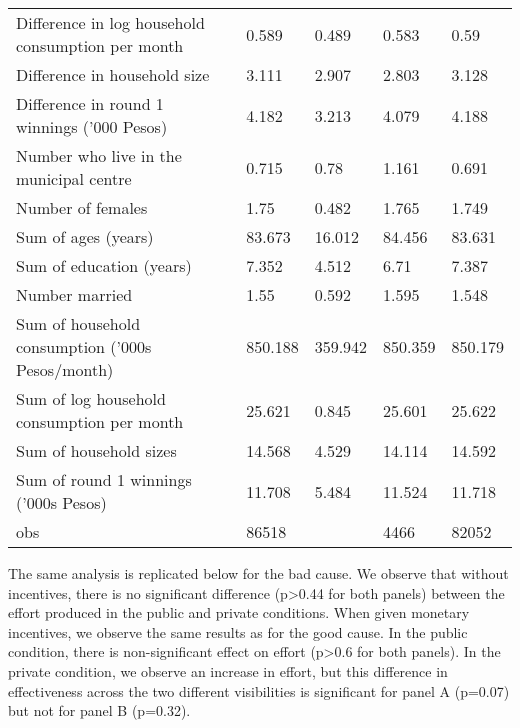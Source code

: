 \documentclass[]{elsarticle} %
\begin{document}
\begin{table}[!h]
\begin{tabular}{lllll}
Difference in log household consumption per month & 0.589 & 0.489 & 0.583 & 0.59\\
Difference in household size & 3.111 & 2.907 & 2.803 & 3.128\\
Difference in round 1 winnings ('000 Pesos) & 4.182 & 3.213 & 4.079 & 4.188\\
\addlinespace
Number who live in the municipal centre & 0.715 & 0.78 & 1.161 & 0.691\\
Number of females & 1.75 & 0.482 & 1.765 & 1.749\\
Sum of ages (years) & 83.673 & 16.012 & 84.456 & 83.631\\
Sum of education (years) & 7.352 & 4.512 & 6.71 & 7.387\\
Number married & 1.55 & 0.592 & 1.595 & 1.548\\
\addlinespace
Sum of household consumption ('000s Pesos/month) & 850.188 & 359.942 & 850.359 & 850.179\\
Sum of log household consumption per month & 25.621 & 0.845 & 25.601 & 25.622\\
Sum of household sizes & 14.568 & 4.529 & 14.114 & 14.592\\
Sum of round 1 winnings ('000s Pesos) & 11.708 & 5.484 & 11.524 & 11.718\\
obs & 86518 &  & 4466 & 82052\\
\bottomrule
\end{tabular}
\endgroup{}
\end{table}

The same analysis is replicated below for the bad cause. We observe that
without incentives, there is no significant difference
(p\textgreater{}0.44 for both panels) between the effort produced in the
public and private conditions. When given monetary incentives, we
observe the same results as for the good cause. In the public condition,
there is non-significant effect on effort (p\textgreater{}0.6 for both
panels). In the private condition, we observe an increase in effort, but
this difference in effectiveness across the two different visibilities
is significant for panel A (p=0.07) but not for panel B (p=0.32).
\end{document}
